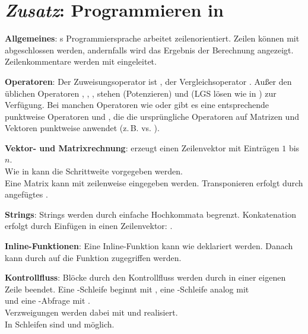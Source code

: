 \chapter{%
    \emph{Zusatz}: Programmieren in \matlab{}%
}

\textbf{Allgemeines}:
\matlab{}s Programmiersprache arbeitet zeilenorientiert.
Zeilen können mit \code{;} abgeschlossen werden, andernfalls wird das
Ergebnis der Berechnung angezeigt.
Zeilenkommentare werden mit \code{\%} eingeleitet.

\textbf{Operatoren}:
Der Zuweisungsoperator ist \code{=}, der Vergleichsoperator \code{==}.
Außer den üblichen Operatoren \code{+}, \code{-}, \code{*}, \code{/} stehen
\code{^} (Potenzieren) und \code{\\} (LGS lösen wie in )
zur Verfügung.
Bei manchen Operatoren wie \code{*} oder \code{^} gibt es eine entsprechende
punktweise Operatoren  und , die die ursprüngliche Operatoren
auf Matrizen und Vektoren punktweise anwendet (z.\,B.  vs.
).

\textbf{Vektor- und Matrixrechnung}:
 erzeugt einen Zeilenvektor mit Einträgen $1$ bis $n$. \\
Wie in  kann die Schrittweite vorgegeben werden. \\
Eine Matrix kann mit \code{[a1, a2, a3; a4, a5, a6]} zeilenweise eingegeben
werden.
Transponieren erfolgt durch angefügtes .

\textbf{Strings}:
Strings werden durch einfache Hochkommata  begrenzt.
Konkatenation erfolgt durch Einfügen in einen Zeilenvektor:
.

\textbf{Inline-Funktionen}:
Eine Inline-Funktion kann wie  deklariert werden.
Danach kann durch  auf die Funktion zugegriffen werden.

\textbf{Kontrollfluss}:
Blöcke durch den Kontrollfluss werden durch  in einer eigenen
Zeile beendet.
Eine -Schleife beginnt mit ,
eine -Schleife analog mit \\
 und
eine -Abfrage mit . \\
Verzweigungen werden dabei mit  und 
realisiert. \\
In Schleifen sind  und  möglich.

